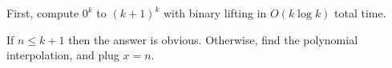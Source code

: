 First, compute $0^k$ to $(k+1)^k$ with binary lifting in $O(k \log k)$ total time.

If $n \le k+1$ then the answer is obvious.
Otherwise, find the polynomial interpolation, and plug $x = n$.